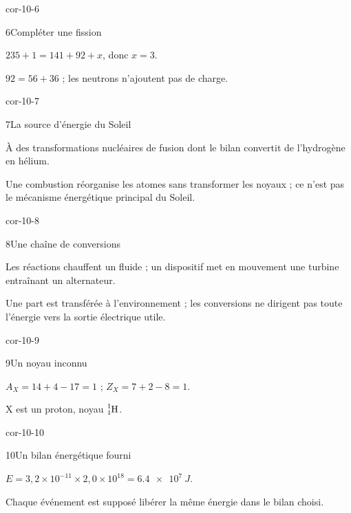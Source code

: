 \begin{blocLivre}{cor-10-6}\begin{corrige}{6}{Compléter une fission}
\begin{questions}
\item $235+1=141+92+x$, donc $x=3$.
\item $92=56+36$ ; les neutrons n’ajoutent pas de charge.
\end{questions}
\end{corrige}\end{blocLivre}
\begin{blocLivre}{cor-10-7}\begin{corrige}{7}{La source d’énergie du Soleil}
\begin{questions}
\item À des transformations nucléaires de fusion dont le bilan convertit de l’hydrogène en hélium.
\item Une combustion réorganise les atomes sans transformer les noyaux ; ce n’est pas le mécanisme énergétique principal du Soleil.
\end{questions}
\end{corrige}\end{blocLivre}
\begin{blocLivre}{cor-10-8}\begin{corrige}{8}{Une chaîne de conversions}
\begin{questions}
\item Les réactions chauffent un fluide ; un dispositif met en mouvement une turbine entraînant un alternateur.
\item Une part est transférée à l’environnement ; les conversions ne dirigent pas toute l’énergie vers la sortie électrique utile.
\end{questions}
\end{corrige}\end{blocLivre}
\begin{blocLivre}{cor-10-9}\begin{corrige}{9}{Un noyau inconnu}
\begin{questions}
\item $A_X=14+4-17=1$ ; $Z_X=7+2-8=1$.
\item X est un proton, noyau $\ce{^{1}_{1}H}$.
\end{questions}
\end{corrige}\end{blocLivre}
\begin{blocLivre}{cor-10-10}\begin{corrige}{10}{Un bilan énergétique fourni}
\begin{questions}
\item $E=3,2\times10^{-11}\times2,0\times10^{18}=\qty{6,4e7}{J}$.
\item Chaque événement est supposé libérer la même énergie dans le bilan choisi.
\end{questions}
\end{corrige}\end{blocLivre}
